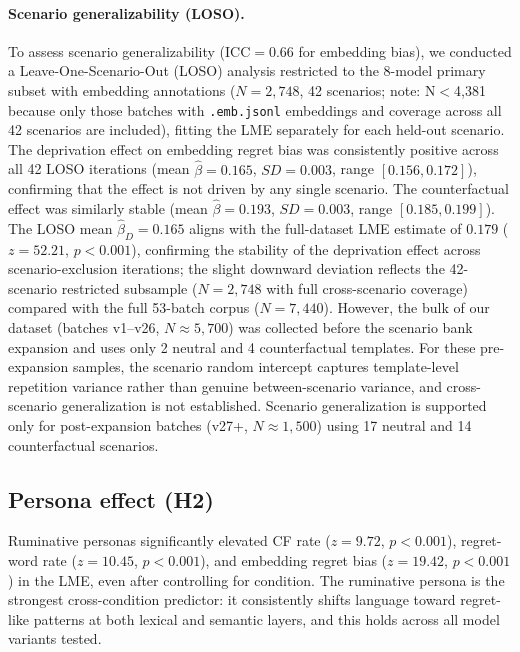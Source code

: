 \documentclass[11pt]{article}
\begin{document}
\paragraph{Scenario generalizability (LOSO).}
To assess scenario generalizability (ICC$=0.66$ for embedding bias), we conducted a Leave-One-Scenario-Out (LOSO) analysis restricted to the 8-model primary subset with embedding annotations ($N=2{,}748$, 42 scenarios; note: N$<$4,381 because only those batches with \texttt{.emb.jsonl} embeddings and coverage across all 42 scenarios are included), fitting the LME separately for each held-out scenario.
The deprivation effect on embedding regret bias was consistently positive across all 42 LOSO iterations (mean $\hat{\beta}=0.165$, $SD=0.003$, range $[0.156, 0.172]$), confirming that the effect is not driven by any single scenario. The counterfactual effect was similarly stable (mean $\hat{\beta}=0.193$, $SD=0.003$, range $[0.185, 0.199]$). The LOSO mean $\hat{\beta}_D=0.165$ aligns with the full-dataset LME estimate of $0.179$ ($z=52.21$, $p<0.001$), confirming the stability of the deprivation effect across scenario-exclusion iterations; the slight downward deviation reflects the 42-scenario restricted subsample ($N=2{,}748$ with full cross-scenario coverage) compared with the full 53-batch corpus ($N=7{,}440$).
However, the bulk of our dataset (batches v1--v26, $N\approx5{,}700$) was collected before the scenario bank expansion and uses only 2 neutral and 4 counterfactual templates. For these pre-expansion samples, the scenario random intercept captures template-level repetition variance rather than genuine between-scenario variance, and cross-scenario generalization is not established. Scenario generalization is supported only for post-expansion batches (v27+, $N\approx1{,}500$) using 17 neutral and 14 counterfactual scenarios.

\subsection{Persona effect (H2)}

Ruminative personas significantly elevated CF rate ($z=9.72$, $p<0.001$), regret-word rate ($z=10.45$, $p<0.001$), and embedding regret bias ($z=19.42$, $p<0.001$) in the LME, even after controlling for condition. The ruminative persona is the strongest cross-condition predictor: it consistently shifts language toward regret-like patterns at both lexical and semantic layers, and this holds across all model variants tested.
\end{document}
